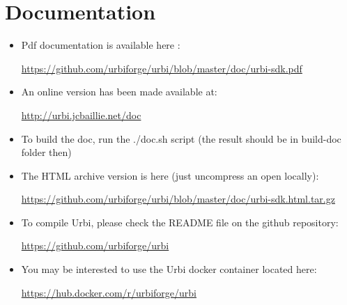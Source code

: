 \renewenvironment{partDescription}[2]
{%
  \chapter*{About This Part}
  #2
  \begin{description}%
    \let\itemOrig\item%
    \renewcommand{\item}[1][]{\itemOrig[~~\autoref{##1} --- \nameref{##1}]~\\}%
  }{%
  \end{description}%
}

\section{Documentation}

\begin{itemize}
\item Pdf documentation is available here : 

\url{https://github.com/urbiforge/urbi/blob/master/doc/urbi-sdk.pdf}
\item An online version has been made available at:

\url{http://urbi.jcbaillie.net/doc}
\item To build the doc, run the ./doc.sh script (the result should be in build-doc folder then)
\item The HTML archive version is here (just uncompress an open locally):

\url{https://github.com/urbiforge/urbi/blob/master/doc/urbi-sdk.html.tar.gz}
\item To compile Urbi, please check the README file on the github repository:

\url{https://github.com/urbiforge/urbi}
\item You may be interested to use the Urbi docker container located here:

\url{https://hub.docker.com/r/urbiforge/urbi}
\end{itemize}


